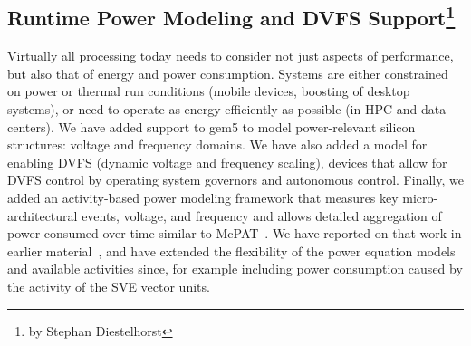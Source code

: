 \subsection[Runtime Power Modeling and DVFS Support]{Runtime Power Modeling and DVFS Support\footnote{by Stephan Diestelhorst}}

Virtually all processing today needs to consider not just aspects of performance, but also that of energy and power consumption. Systems are either constrained on power or thermal run conditions (mobile devices, boosting of desktop systems), or need to operate as energy efficiently as possible (in HPC and data centers).
We have added support to gem5 to model power-relevant silicon structures: voltage and frequency domains.
We have also added a model for enabling DVFS (dynamic voltage and frequency scaling), devices that allow for DVFS control by operating system governors and autonomous control.
Finally, we added an activity-based power modeling framework that measures key micro-architectural events, voltage, and frequency and allows detailed aggregation of power consumed over time similar to McPAT~\cite{LiAhn2009-mcpat, LiAhn2013-mcpat}.
We have reported on that work in earlier material~\cite{SpiliopoulosBHAK13}, and have extended the flexibility of the power equation models and available activities since, for example including power consumption caused by the activity of the SVE vector units.
